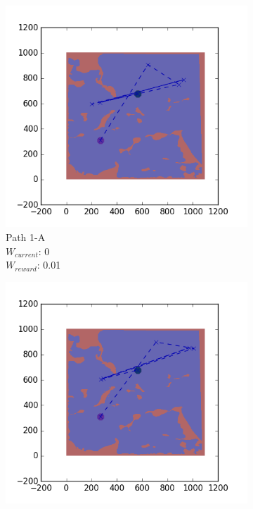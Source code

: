 \documentclass{tamuccthesis}
\begin{document}
\begin{figure}
    \centering
    \begin{subfigure}[b]{0.24\textwidth}
        \centering
            \includegraphics[width=\textwidth,trim={4cm 3cm 2cm 3cm},clip]{EXP3RG_PathAa_-1_-1_0_0d01.png}
        \caption{{\small Path 1-A \\ $W_{current}$: 0 \\ $W_{reward}$: 0.01}}    
        \label{fig:Path_1-A_upReward_noWork}
    \end{subfigure}
    \begin{subfigure}[b]{0.24\textwidth}  
        \centering 
        \includegraphics[width=\textwidth,trim={4cm 3cm 2cm 3cm},clip]{EXP3RG_PathAa_-1_-1_-1_0d01.png}

\end{subfigure}
\end{figure}
\end{document}
